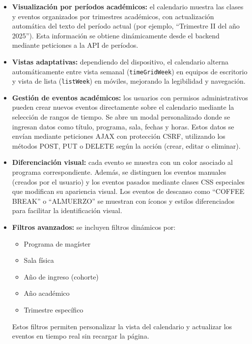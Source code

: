 \begin{itemize}
    \item \textbf{Visualización por períodos académicos:} el calendario muestra las clases y eventos organizados por trimestres académicos, con actualización automática del texto del período actual (por ejemplo, ``Trimestre II del año 2025''). Esta información se obtiene dinámicamente desde el backend mediante peticiones a la API de períodos.
    
    \item \textbf{Vistas adaptativas:} dependiendo del dispositivo, el calendario alterna automáticamente entre vista semanal (\texttt{timeGridWeek}) en equipos de escritorio y vista de lista (\texttt{listWeek}) en móviles, mejorando la legibilidad y navegación.
    
    \item \textbf{Gestión de eventos académicos:} los usuarios con permisos administrativos pueden crear nuevos eventos directamente sobre el calendario mediante la selección de rangos de tiempo. Se abre un modal personalizado donde se ingresan datos como título, programa, sala, fechas y horas. Estos datos se envían mediante peticiones AJAX con protección CSRF, utilizando los métodos POST, PUT o DELETE según la acción (crear, editar o eliminar).
    
    \item \textbf{Diferenciación visual:} cada evento se muestra con un color asociado al programa correspondiente. Además, se distinguen los eventos manuales (creados por el usuario) y los eventos pasados mediante clases CSS especiales que modifican su apariencia visual. Los eventos de descanso como ``COFFEE BREAK'' o ``ALMUERZO'' se muestran con íconos y estilos diferenciados para facilitar la identificación visual.
    
    \item \textbf{Filtros avanzados:} se incluyen filtros dinámicos por:
    \begin{itemize}
        \item Programa de magíster
        \item Sala física
        \item Año de ingreso (cohorte)
        \item Año académico
        \item Trimestre específico
    \end{itemize}
    Estos filtros permiten personalizar la vista del calendario y actualizar los eventos en tiempo real sin recargar la página.
    

\end{itemize}
